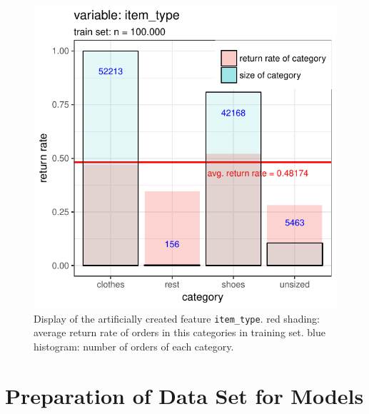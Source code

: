 \documentclass[a4paper,12pt]{article}
\begin{document}
\begin{figure}
  \begin{minipage}[c]{0.55\textwidth}
    \includegraphics[width=\textwidth]{pictures/item_type.pdf}
  \end{minipage}\hfill
  \begin{minipage}[c]{0.4\textwidth}
    \caption{Display of the artificially created feature \texttt{item\_type}. red shading: average return rate of orders in this categories in training set. blue histogram: number of orders of each category.}
    \label{Figure::ItemType}
  \end{minipage}
\end{figure}



\section{Preparation of Data Set for Models}\label{Sec::PrepDataSet}
\end{document}
